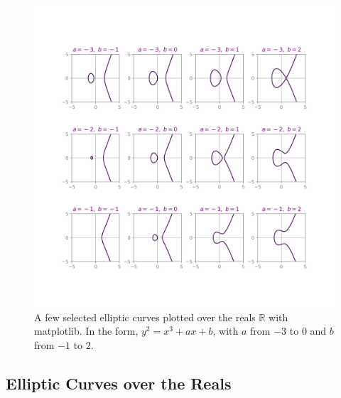 \documentclass[11pt, a4paper]{report}
\newcommand{\reals}{\mathbb{R}}
\begin{document}
\begin{figure}[ht]
\begin{center}
\includegraphics[width=.9\linewidth]{elliptic_curves.png} 
\caption{A few selected elliptic curves plotted over the reals $\reals$ with matplotlib. In the form, $y^2 = x^3+ax+b$, with $a$ from $-3$ to $0$ and $b$ from  $-1$ to $2$.}
\label{fig:realECs}
\end{center}
\end{figure}

\subsection{Elliptic Curves over the Reals}
\end{document}
